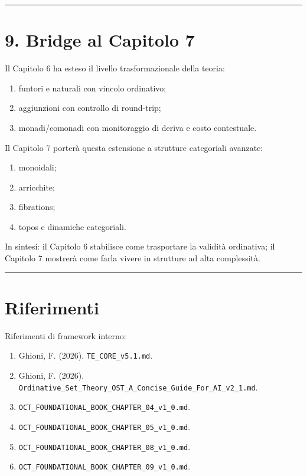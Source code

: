 \begin{center}\rule{0.5\linewidth}{0.5pt}\end{center}

\section{9. Bridge al Capitolo 7}

Il Capitolo 6 ha esteso il livello trasformazionale della teoria:

\begin{enumerate}
\def\labelenumi{\arabic{enumi}.}
\tightlist
\item
  funtori e naturali con vincolo ordinativo;
\item
  aggiunzioni con controllo di round-trip;
\item
  monadi/comonadi con monitoraggio di deriva e costo contestuale.
\end{enumerate}

Il Capitolo 7 porterà questa estensione a strutture categoriali avanzate:

\begin{enumerate}
\def\labelenumi{\arabic{enumi}.}
\tightlist
\item
  monoidali;
\item
  arricchite;
\item
  fibrations;
\item
  topos e dinamiche categoriali.
\end{enumerate}

In sintesi: il Capitolo 6 stabilisce come trasportare la validità ordinativa; il Capitolo 7 mostrerà come farla vivere in strutture ad alta complessità.

\begin{center}\rule{0.5\linewidth}{0.5pt}\end{center}

\section{Riferimenti}

Riferimenti di framework interno:

\begin{enumerate}
\def\labelenumi{\arabic{enumi}.}
\tightlist
\item
  Ghioni, F. (2026). \texttt{TE\_CORE\_v5.1.md}.
\item
  Ghioni, F. (2026). \texttt{Ordinative\_Set\_Theory\_OST\_A\_Concise\_Guide\_For\_AI\_v2\_1.md}.
\item
  \texttt{OCT\_FOUNDATIONAL\_BOOK\_CHAPTER\_04\_v1\_0.md}.
\item
  \texttt{OCT\_FOUNDATIONAL\_BOOK\_CHAPTER\_05\_v1\_0.md}.
\item
  \texttt{OCT\_FOUNDATIONAL\_BOOK\_CHAPTER\_08\_v1\_0.md}.
\item
  \texttt{OCT\_FOUNDATIONAL\_BOOK\_CHAPTER\_09\_v1\_0.md}.
\end{enumerate}

